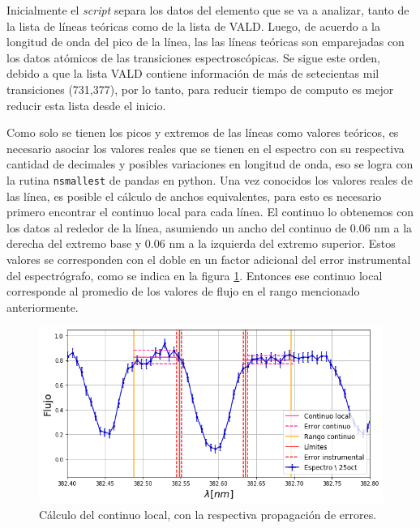 \documentclass[12pt,oneside,openany,letter]{book}
\begin{document}
Inicialmente el \textit{script} separa los datos del elemento que se va a analizar, tanto de la lista de líneas teóricas como de la lista de VALD. Luego, de acuerdo a la longitud de onda del pico de la línea, las las líneas teóricas son emparejadas con los datos atómicos de las transiciones espectroscópicas. Se sigue este orden, debido a que la lista VALD contiene información de más de setecientas mil transiciones (731,377), por lo tanto, para reducir tiempo de computo es mejor reducir esta lista desde el inicio.


Como solo se tienen los picos y extremos de las líneas como valores teóricos, es necesario asociar los valores reales que se tienen en el espectro con su respectiva cantidad de decimales y posibles variaciones en longitud de onda, eso se logra con la rutina \texttt{nsmallest} de pandas en python. Una vez conocidos los valores reales de las línea, es posible el cálculo de anchos equivalentes, para esto es necesario primero encontrar el continuo local para cada línea. El continuo lo obtenemos con los datos al rededor de la línea,
asumiendo un ancho del continuo de 0.06 nm a la derecha del extremo base y 0.06 nm a la izquierda del extremo superior. Estos valores se corresponden con el doble en un factor adicional del error instrumental del espectrógrafo, como se indica en la figura \ref{fig:continuo}. Entonces ese continuo local corresponde al promedio de los valores de flujo en el rango mencionado anteriormente.

\begin{figure}[h]
    \centering
    \includegraphics[width=1\linewidth]{Gaficas/continuo.png}
    \caption{Cálculo del continuo local, con la respectiva propagación de errores.}
    \label{fig:continuo}
\end{figure}
\end{document}
